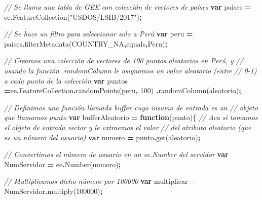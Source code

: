 \documentclass[
  12pt,
  letterpaper,
  twoside]{book}
\newenvironment{Shaded}{\begin{snugshade}}{\end{snugshade}}
\newcommand{\AttributeTok}[1]{\textcolor[rgb]{0.77,0.63,0.00}{#1}}
\newcommand{\CommentTok}[1]{\textcolor[rgb]{0.56,0.35,0.01}{\textit{#1}}}
\newcommand{\DecValTok}[1]{\textcolor[rgb]{0.00,0.00,0.81}{#1}}
\newcommand{\FunctionTok}[1]{\textcolor[rgb]{0.00,0.00,0.00}{#1}}
\newcommand{\KeywordTok}[1]{\textcolor[rgb]{0.13,0.29,0.53}{\textbf{#1}}}
\newcommand{\NormalTok}[1]{#1}
\newcommand{\OperatorTok}[1]{\textcolor[rgb]{0.81,0.36,0.00}{\textbf{#1}}}
\newcommand{\StringTok}[1]{\textcolor[rgb]{0.31,0.60,0.02}{#1}}
\begin{document}
\begin{Shaded}
\begin{Highlighting}[]
\CommentTok{// Se llama una tabla de GEE con colección de vectores de paises }
\KeywordTok{var}\NormalTok{ paises }\OperatorTok{=}\NormalTok{ ee}\OperatorTok{.}\FunctionTok{FeatureCollection}\NormalTok{(}\StringTok{"USDOS/LSIB/2017"}\NormalTok{)}\OperatorTok{;} 

\CommentTok{// Se hace un filtro para seleccionar solo a Perú }
\KeywordTok{var}\NormalTok{ peru }\OperatorTok{=}\NormalTok{ paises}\OperatorTok{.}\FunctionTok{filterMetadata}\NormalTok{(}\StringTok{\textquotesingle{}COUNTRY\_NA\textquotesingle{}}\OperatorTok{,}\StringTok{\textquotesingle{}equals\textquotesingle{}}\OperatorTok{,}\StringTok{\textquotesingle{}Peru\textquotesingle{}}\NormalTok{)}\OperatorTok{;} 

\CommentTok{// Creamos una colección de vectores de 100 puntos aleatorios en Perú, y }
\CommentTok{// usando la función .randomColumn le asignamos un valor aleatorio (entre }
\CommentTok{// 0{-}1) a cada punto de la colección}
\KeywordTok{var}\NormalTok{ puntos }\OperatorTok{=}\NormalTok{ee}\OperatorTok{.}\AttributeTok{FeatureCollection}\OperatorTok{.}\FunctionTok{randomPoints}\NormalTok{(peru}\OperatorTok{,} \DecValTok{100}\NormalTok{)}
  \OperatorTok{.}\FunctionTok{randomColumn}\NormalTok{(}\StringTok{\textquotesingle{}aleatorio\textquotesingle{}}\NormalTok{)}\OperatorTok{;}  

\CommentTok{// Definimos una función llamada buffer cuyo insumo de entrada es un }
\CommentTok{// objeto que llamamos \textquotesingle{}punto\textquotesingle{}}
\KeywordTok{var}\NormalTok{ bufferAleatorio }\OperatorTok{=} \KeywordTok{function}\NormalTok{(punto)\{   }
  \CommentTok{// Aca si tomamos el objeto de entrada \textquotesingle{}vector\textquotesingle{} y le extraemos el valor }
  \CommentTok{// del atributo \textquotesingle{}aleatorio\textquotesingle{} (que es un número del usuario)  }
  \KeywordTok{var}\NormalTok{ numero }\OperatorTok{=}\NormalTok{ punto}\OperatorTok{.}\FunctionTok{get}\NormalTok{(}\StringTok{\textquotesingle{}aleatorio\textquotesingle{}}\NormalTok{)}\OperatorTok{;}  
 
  \CommentTok{// Convertimos el número de usuario en un \textasciigrave{}ee.Number\textasciigrave{} del servidor}
  \KeywordTok{var}\NormalTok{ NumServidor }\OperatorTok{=}\NormalTok{ ee}\OperatorTok{.}\FunctionTok{Number}\NormalTok{(numero)}\OperatorTok{;}   

  \CommentTok{// Multiplicamos dicho número por 100000}
  \KeywordTok{var}\NormalTok{ multiplicar }\OperatorTok{=}\NormalTok{ NumServidor}\OperatorTok{.}\FunctionTok{multiply}\NormalTok{(}\DecValTok{100000}\NormalTok{)}\OperatorTok{;} 
 

\end{Highlighting}
\end{Shaded}
\end{document}
